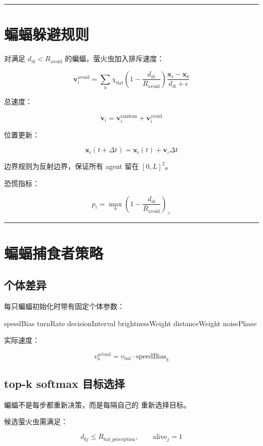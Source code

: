 \documentclass[UTF8]{ctexart}
\begin{document}
\bigskip
\hrule
\bigskip

\section{蝙蝠躲避规则}

对满足 $d_{ib}<R_{\text{avoid}}$ 的蝙蝠，萤火虫加入排斥速度：

\[
\mathbf{v}_i^{\text{avoid}}
=
\sum_b
\chi_{\text{bat}}
\left(1-\frac{d_{ib}}{R_{\text{avoid}}}\right)
\frac{\mathbf{x}_i-\mathbf{x}_b}{d_{ib}+\epsilon}
\]

总速度：

\[
\mathbf{v}_i
=
\mathbf{v}_i^{\text{random}}
+
\mathbf{v}_i^{\text{avoid}}
\]

位置更新：

\[
\mathbf{x}_i(t+\Delta t)
=
\mathbf{x}_i(t)
+
\mathbf{v}_i\Delta t
\]

边界规则为反射边界，保证所有 agent 留在 $[0,L]^2$。

恐慌指标：

\[
p_i
=
\max_b
\left(1-\frac{d_{ib}}{R_{\text{avoid}}}\right)_+
\]

\bigskip
\hrule
\bigskip

\section{蝙蝠捕食者策略}

\subsection{个体差异}

每只蝙蝠初始化时带有固定个体参数：

\begin{codeblock}
speedBias
turnRate
decisionInterval
brightnessWeight
distanceWeight
noisePhase
\end{codeblock}

实际速度：

\[
v_b^{\text{actual}}
=
v_{\text{bat}}\cdot \text{speedBias}_b
\]

\subsection{top-k softmax 目标选择}

蝙蝠不是每步都重新决策，而是每隔自己的 \texttt{} 重新选择目标。

候选萤火虫需满足：

\[
d_{bj}\le R_{\text{bat\_perception}},
\qquad
\text{alive}_j=1
\]
\end{document}
